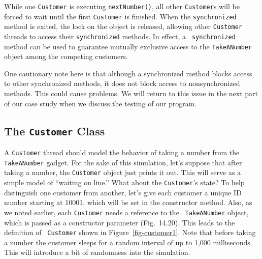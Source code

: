 While one {\tt Customer} is executing {\tt nextNumber()}, all other
{\tt Customer}s will be forced to wait until the first {\tt Customer}
is finished.  When the {\tt synchronized} method is exited, the lock
on the object is released, allowing other {\tt Customer} threads to
access their {\tt synchronized} methods.  In effect, a {\tt
synchronized} method can be used to guarantee mutually exclusive
access to the {\tt TakeANumber} object among the competing customers.



\noindent One cautionary note here is that although a synchronized method blocks
access to other synchronized methods, it does not block access to
nonsynchronized methods.   This could cause problems.   We
will return to this issue in the next part of our case study when we discuss the
testing of our program.

\subsection{The {\tt Customer} Class}
\noindent A {\tt Customer} thread should model the behavior of taking a number
from the {\tt TakeANumber} gadget.   For the sake of this simulation,
let's suppose that after taking a number, the {\tt Customer} object just prints it
out.  This will serve as a simple model of ``waiting on line.'' What
about the {\tt Customer}'s state?  To help distinguish one customer
from another, let's give each customer a unique ID number starting at
10001, which will be set in the constructor method.  Also, as we noted
earlier, each {\tt Customer} needs a reference to the {\tt
TakeANumber} object, which is passed as a constructor parameter
(Fig.~14.20).  This leads to the definition of {\tt
Customer} shown in Figure~\ref{fig-customer1}.  Note that before
taking a number the customer sleeps for a random interval of up to
1,000 milliseconds.  This will introduce a bit of randomness into the
simulation.

